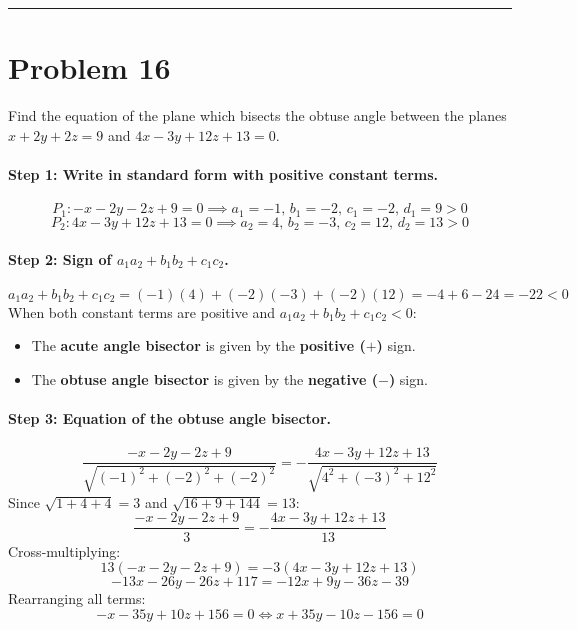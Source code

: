 \documentclass[11pt,a4paper]{article}
\begin{document}
\vspace{0.4cm}
\hrule
\vspace{0.4cm}

\section{Problem 16}
\begin{problembox}[Problem 16]
Find the equation of the plane which bisects the obtuse angle between the planes $x + 2y + 2z = 9$ and $4x - 3y + 12z + 13 = 0$.
\end{problembox}

\paragraph{Step 1: Write in standard form with positive constant terms.}
$$P_1: -x - 2y - 2z + 9 = 0 \implies a_1 = -1, \, b_1 = -2, \, c_1 = -2, \, d_1 = 9 > 0$$
$$P_2: 4x - 3y + 12z + 13 = 0 \implies a_2 = 4, \, b_2 = -3, \, c_2 = 12, \, d_2 = 13 > 0$$

\paragraph{Step 2: Sign of $a_1 a_2 + b_1 b_2 + c_1 c_2$.}
$$a_1 a_2 + b_1 b_2 + c_1 c_2 = (-1)(4) + (-2)(-3) + (-2)(12) = -4 + 6 - 24 = -22 < 0$$
When both constant terms are positive and $a_1 a_2 + b_1 b_2 + c_1 c_2 < 0$:
\begin{itemize}
    \item The \textbf{acute angle bisector} is given by the \textbf{positive ($+$)} sign.
    \item The \textbf{obtuse angle bisector} is given by the \textbf{negative ($-$)} sign.
\end{itemize}

\paragraph{Step 3: Equation of the obtuse angle bisector.}
$$\frac{-x - 2y - 2z + 9}{\sqrt{(-1)^2 + (-2)^2 + (-2)^2}} = - \frac{4x - 3y + 12z + 13}{\sqrt{4^2 + (-3)^2 + 12^2}}$$
Since $\sqrt{1 + 4 + 4} = 3$ and $\sqrt{16 + 9 + 144} = 13$:
$$\frac{-x - 2y - 2z + 9}{3} = - \frac{4x - 3y + 12z + 13}{13}$$
Cross-multiplying:
$$13(-x - 2y - 2z + 9) = -3(4x - 3y + 12z + 13)$$
$$-13x - 26y - 26z + 117 = -12x + 9y - 36z - 39$$
Rearranging all terms:
$$-x - 35y + 10z + 156 = 0 \iff x + 35y - 10z - 156 = 0$$
\end{document}
